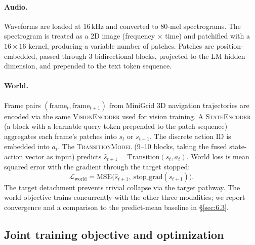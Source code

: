 \paragraph{Audio.} Waveforms are loaded at 16\,kHz and converted to 80-mel spectrograms. The spectrogram is treated as a 2D image (frequency $\times$ time) and patchified with a $16\times16$ kernel, producing a variable number of patches. Patches are position-embedded, passed through 3 bidirectional \QCBi{} blocks, projected to the LM hidden dimension, and prepended to the text token sequence.

\paragraph{World.} Frame pairs $(\text{frame}_t, \text{frame}_{t+1})$ from MiniGrid 3D navigation trajectories are encoded via the same \textsc{VisionEncoder} used for vision training. A \textsc{StateEncoder} (a \QCBi{} block with a learnable query token prepended to the patch sequence) aggregates each frame's patches into $s_t$ or $s_{t+1}$. The discrete action ID is embedded into $a_t$. The \textsc{TransitionModel} (9--10 \QCBi{} blocks, taking the fused state-action vector as input) predicts $\hat{s}_{t+1} = \text{Transition}(s_t, a_t)$. World loss is mean squared error with the gradient through the target stopped:
\begin{equation}
\mathcal{L}_{\text{world}} = \text{MSE}\bigl(\hat{s}_{t+1},\ \text{stop\_grad}(s_{t+1})\bigr). \label{eq:5}
\end{equation}
The target detachment prevents trivial collapse via the target pathway. The world objective trains concurrently with the other three modalities; we report convergence and a comparison to the predict-mean baseline in \S\ref{sec:6.3}.

\subsection{Joint training objective and optimization}\label{sec:3.4}

